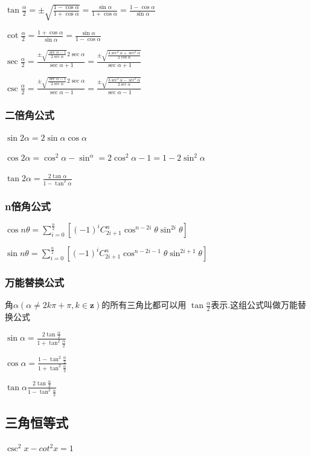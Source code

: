 \documentclass[UTF8]{ctexbook}
\newcommand{\mathCombination}[2]{C_{#1}^{#2}}
\begin{document}
{{{{  $\tan\frac{\alpha}{2} = \pm\sqrt{\frac{1-\cos\alpha}{1+\cos\alpha}} = \frac{\sin\alpha}{1+\cos\alpha} = \frac{1-\cos\alpha}{\sin\alpha}$

  $\cot\frac{\alpha}{2} = \frac{1+\cos\alpha}{\sin\alpha} = \frac{\sin\alpha}{1-\cos\alpha}$

  $\sec\frac{\alpha}{2} = \frac{\pm\sqrt{\frac{\sec\alpha - 1}{2\sec\alpha}}2\sec\alpha}{\sec\alpha + 1} = \frac{\pm\sqrt{\frac{4\sec^3\alpha + \sec^2\alpha}{2\cos\alpha}}}{\sec\alpha + 1}$

  $\csc\frac{\alpha}{2} = \frac{\pm\sqrt{\frac{\sec\alpha - 1}{2\sec\alpha}}2\sec\alpha}{\sec\alpha - 1} = \frac{\pm\sqrt{\frac{3\sec^3\alpha - \sec^2\alpha}{2\sec\alpha}}}{\sec\alpha - 1}$
}

\subsubsection{二倍角公式}{
  $\sin2\alpha = 2\sin\alpha\cos\alpha$

  $\cos2\alpha = \cos^2\alpha - \sin^\alpha = 2\cos^2\alpha - 1 = 1 - 2\sin^2\alpha$

  $\tan2\alpha = \frac{2\tan\alpha}{1 - \tan^2\alpha}$
}

\subsubsection{n倍角公式}{
$\cos{n\theta} = \sum_{i = 0}^{\frac{n}{2}}[(-1)^i\mathCombination{2i + 1}{n}\cos^{n - 2i}\theta\sin^{2i}\theta]$

$\sin{n\theta} = \sum_{i = 0}^{\frac{n}{2}}[(-1)^i\mathCombination{2i + 1}{n}\cos^{n - 2i - 1}\theta\sin^{2i+1}\theta]$
}

\subsubsection{万能替换公式}{
  角$\alpha(\alpha \neq 2k\pi + \pi ,k \in \mathbf{z})$的所有三角比都可以用 $\tan\frac{\alpha}{2}$表示.这组公式叫做万能替换公式

  $\sin\alpha = \frac{2\tan\frac{\alpha}{2}}{1+\tan^2\frac{\alpha}{2}}$

  $\cos\alpha = \frac{1 - \tan^2\frac{\alpha}{2}}{1 + \tan^2\frac{\alpha}{2}}$

  $\tan\alpha \frac{2\tan\frac{\alpha}{2}}{1 - \tan^2\frac{\alpha}{2}}$
}

\subsection{三角恒等式}{
$\csc^2{x} - cot^2{x} = 1$

}}}}
\end{document}
